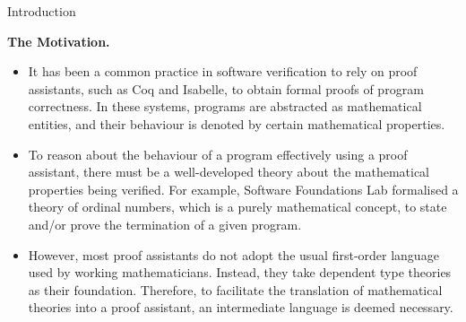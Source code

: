 \documentclass[serif,table,10pt]{beamer}
\newcommand{\0}{\texttt{0}}
\newcommand{\1}{\texttt{1}}
\begin{document}
\begin{frame}{Introduction}

    \textbf{The Motivation.}

    \begin{itemize}
        \item It has been a common practice in software verification to rely on proof assistants, such as Coq and Isabelle, to obtain formal proofs of program correctness. In these systems, programs are abstracted as mathematical entities, and their behaviour is denoted by certain mathematical properties. 
        \item To reason about the behaviour of a program effectively using a proof assistant, there must be a well-developed theory about the mathematical properties being verified. For example, Software Foundations Lab formalised a theory of ordinal numbers, which is a purely mathematical concept, to state and/or prove the termination of a given program.
        \item However, most proof assistants do not adopt the usual first-order language used by working mathematicians. Instead, they take dependent type theories as their foundation. Therefore, to facilitate the translation of mathematical theories into a proof assistant, an intermediate language is deemed necessary.
    \end{itemize}

\end{frame}
\end{document}
